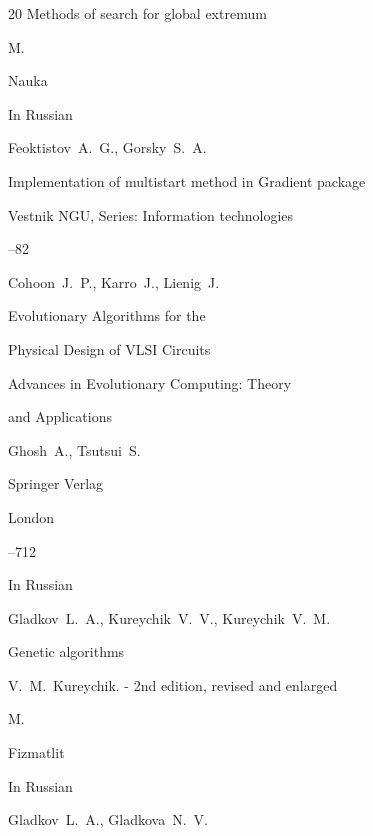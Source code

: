 \begin{thebibliography}{20}
\book Methods of search for global extremum

\publaddr M.

\publ Nauka






\lang In Russian

\by Feoktistov~A.~G., Gorsky~S.~A.

\paper Implementation of multistart method in Gradient package

\jour Vestnik NGU, Series: Information technologies




--82




\by Cohoon~J.~P., Karro~J., Lienig~J.

\paper Evolutionary Algorithms for the

Physical Design of VLSI Circuits

\inbook  Advances in Evolutionary Computing: Theory

and Applications

\ed  Ghosh~A., Tsutsui~S.

\publ Springer Verlag

\publ London


--712




\lang In Russian

\by Gladkov~L.~A., Kureychik~V.~V., Kureychik~V.~M.

\book Genetic algorithms

\ed V.~M.~Kureychik. - 2nd edition, revised and enlarged

\publaddr M.

\publ Fizmatlit






\lang In Russian

\by Gladkov~L.~A., Gladkova~N.~V.


\end{thebibliography}
